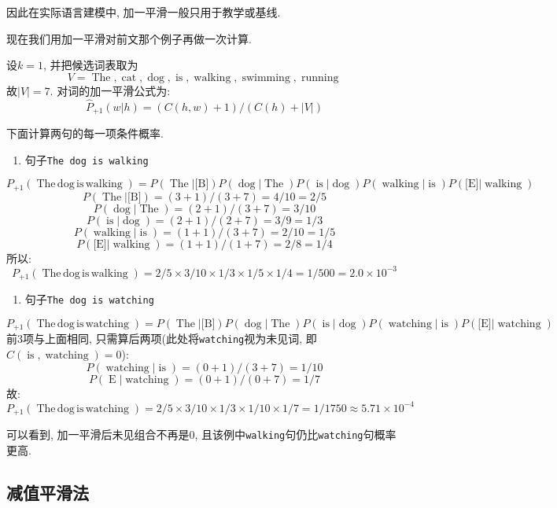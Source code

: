 因此在实际语言建模中, 加一平滑一般只用于教学或基线.

现在我们用加一平滑对前文那个例子再做一次计算.

设$k=1$, 并把候选词表取为
\[
V = {\operatorname{The},\operatorname{cat},\operatorname{dog},\operatorname{is},\operatorname{walking},\operatorname{swimming},\operatorname{running}}
\]
故$|V| = 7$.
对词的加一平滑公式为:
\[
\hat{P}_{+1}(w|h) = (C(h,w)+1)/(C(h)+|V|)
\]

下面计算两句的每一项条件概率.

\begin{enumerate}
\item[1.] 句子\texttt{The dog is walking}
\end{enumerate}
\[
P_{+1}(\operatorname{The\,dog\,is\,walking})
  = P(\operatorname{The}|\text{[B]}) P(\operatorname{dog}|\operatorname{The}) P(\operatorname{is}|\operatorname{dog}) P(\operatorname{walking}|\operatorname{is}) P(\text{[E]}|\operatorname{walking})
\]
\[
P(\operatorname{The}|\text{[B]}) = (3+1)/(3+7) = 4/10 = 2/5
\]
\[
P(\operatorname{dog}|\operatorname{The}) = (2+1)/(3+7) = 3/10
\]
\[
P(\operatorname{is}|\operatorname{dog}) = (2+1)/(2+7) = 3/9 = 1/3
\]
\[
P(\operatorname{walking}|\operatorname{is}) = (1+1)/(3+7) = 2/10 = 1/5
\]
\[
P(\text{[E]}|\operatorname{walking}) = (1+1)/(1+7) = 2/8 = 1/4
\]
所以:
\[
P_{+1}(\operatorname{The\,dog\,is\,walking})
  = 2/5 \times 3/10 \times 1/3 \times 1/5 \times 1/4
  = 1/500
  = 2.0 \times 10^{-3}
\]

\begin{enumerate}
\item[2.] 句子\texttt{The dog is watching}
\end{enumerate}
\[
P_{+1}(\operatorname{The\,dog\,is\,watching})
  = P(\operatorname{The}|\text{[B]}) P(\operatorname{dog}|\operatorname{The}) P(\operatorname{is}|\operatorname{dog}) P(\operatorname{watching}|\operatorname{is}) P(\text{[E]}|\operatorname{watching})
\]
前3项与上面相同, 只需算后两项(此处将\texttt{watching}视为未见词, 即$C(\operatorname{is},\operatorname{watching})=0$):
\[
P(\operatorname{watching}|\operatorname{is}) = (0+1)/(3+7) = 1/10
\]
\[
P(\operatorname{E}|\operatorname{watching}) = (0+1)/(0+7) = 1/7
\]
故:
\[
P_{+1}(\operatorname{The\,dog\,is\,watching})
  = 2/5 \times 3/10 \times 1/3 \times 1/10 \times 1/7
  = 1/1750
  \approx 5.71 \times 10^{-4}
\]

可以看到, 加一平滑后未见组合不再是$0$,
且该例中\texttt{walking}句仍比\texttt{watching}句概率更高.


\subsection{减值平滑法}


